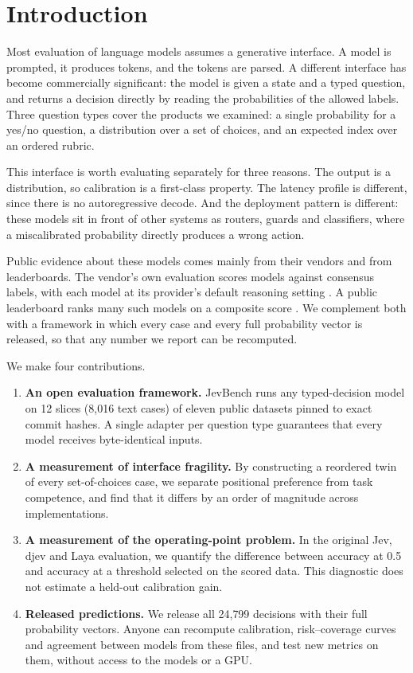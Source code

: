 \section{Introduction}

Most evaluation of language models assumes a generative interface. A model is prompted, it produces tokens, and the tokens are parsed. A different interface has become commercially significant: the model is given a state and a typed question, and returns a decision directly by reading the probabilities of the allowed labels. Three question types cover the products we examined: a single probability for a yes/no question, a distribution over a set of choices, and an expected index over an ordered rubric.

This interface is worth evaluating separately for three reasons. The output is a distribution, so calibration is a first-class property. The latency profile is different, since there is no autoregressive decode. And the deployment pattern is different: these models sit in front of other systems as routers, guards and classifiers, where a miscalibrated probability directly produces a wrong action.

Public evidence about these models comes mainly from their vendors and from leaderboards. The vendor's own evaluation scores models against consensus labels, with each model at its provider's default reasoning setting \citep{typesafe2026evals}. A public leaderboard ranks many such models on a composite score \citep{standhartinger2026jevbench}. We complement both with a framework in which every case and every full probability vector is released, so that any number we report can be recomputed.

We make four contributions.

\begin{enumerate}
  \item \textbf{An open evaluation framework.} JevBench runs any typed-decision model on 12 slices (8{,}016 text cases) of eleven public datasets pinned to exact commit hashes. A single adapter per question type guarantees that every model receives byte-identical inputs.
  \item \textbf{A measurement of interface fragility.} By constructing a reordered twin of every set-of-choices case, we separate positional preference from task competence, and find that it differs by an order of magnitude across implementations.
  \item \textbf{A measurement of the operating-point problem.} In the original Jev, djev and Laya evaluation, we quantify the difference between accuracy at 0.5 and accuracy at a threshold selected on the scored data. This diagnostic does not estimate a held-out calibration gain.
  \item \textbf{Released predictions.} We release all 24{,}799 decisions with their full probability vectors. Anyone can recompute calibration, risk--coverage curves and agreement between models from these files, and test new metrics on them, without access to the models or a GPU.
\end{enumerate}

